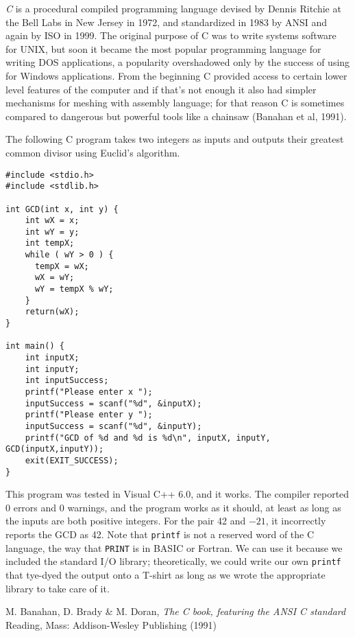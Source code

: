 \documentclass[12pt]{article}
\begin{document}
{\em C} is a procedural compiled programming language devised by Dennis Ritchie at the Bell Labs in New Jersey in 1972, and standardized in 1983 by ANSI and again by ISO in 1999. The original purpose of C was to write systems software for UNIX, but soon it became the most popular programming language for writing DOS applications, a popularity overshadowed only by the success of using  for Windows applications. From the beginning C provided access to certain lower level features of the computer and if that's not enough it also had simpler mechanisms for meshing with assembly language; for that reason C is sometimes compared to dangerous but powerful tools like a chainsaw (Banahan et al, 1991).

The following C program takes two integers as inputs and outputs their greatest common divisor using Euclid's algorithm.

\begin{verbatim}
#include <stdio.h>
#include <stdlib.h>

int GCD(int x, int y) {
    int wX = x;
    int wY = y;
    int tempX;
    while ( wY > 0 ) {
	  tempX = wX;
	  wX = wY;
	  wY = tempX % wY;
    }
    return(wX);
}

int main() {
    int inputX;
    int inputY;
    int inputSuccess;
    printf("Please enter x ");
    inputSuccess = scanf("%d", &inputX);
    printf("Please enter y ");
    inputSuccess = scanf("%d", &inputY);
    printf("GCD of %d and %d is %d\n", inputX, inputY, GCD(inputX,inputY));
    exit(EXIT_SUCCESS);
}
\end{verbatim}

This program was tested in Visual C++ 6.0, and it works. The compiler reported 0 errors and 0 warnings, and the program works as it should, at least as long as the inputs are both positive integers. For the pair 42 and $-21$, it incorrectly reports the GCD as 42. Note that \verb=printf= is not a reserved word of the C language, the way that \verb=PRINT= is in BASIC or Fortran. We can use it because we included the standard I/O library; theoretically, we could write our own \verb=printf= that tye-dyed the output onto a T-shirt as long as we wrote the appropriate library to take care of it.

\begin{thebibliography}{1}
 M. Banahan, D. Brady \& M. Doran, {\it The C book, featuring the ANSI C standard} Reading, Mass: Addison-Wesley Publishing (1991)
\end{thebibliography}
\end{document}
